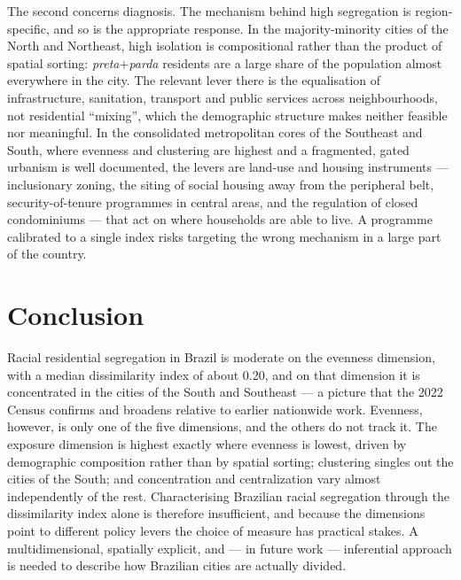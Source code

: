 \documentclass[pdflatex,sn-basic]{sn-jnl}%
\begin{document}
The second concerns diagnosis. The mechanism behind high segregation is region-specific, and so is the appropriate response. In the majority-minority cities of the North and Northeast, high isolation is compositional rather than the product of spatial sorting: \emph{preta}$+$\emph{parda} residents are a large share of the population almost everywhere in the city. The relevant lever there is the equalisation of infrastructure, sanitation, transport and public services across neighbourhoods, not residential ``mixing'', which the demographic structure makes neither feasible nor meaningful. In the consolidated metropolitan cores of the Southeast and South, where evenness and clustering are highest and a fragmented, gated urbanism is well documented, the levers are land-use and housing instruments --- inclusionary zoning, the siting of social housing away from the peripheral belt, security-of-tenure programmes in central areas, and the regulation of closed condominiums --- that act on where households are able to live. A programme calibrated to a single index risks targeting the wrong mechanism in a large part of the country.

\section{Conclusion}\label{sec:conclusion}

Racial residential segregation in Brazil is moderate on the evenness dimension, with a median dissimilarity index of about 0.20, and on that dimension it is concentrated in the cities of the South and Southeast --- a picture that the 2022 Census confirms and broadens relative to earlier nationwide work. Evenness, however, is only one of the five dimensions, and the others do not track it. The exposure dimension is highest exactly where evenness is lowest, driven by demographic composition rather than by spatial sorting; clustering singles out the cities of the South; and concentration and centralization vary almost independently of the rest. Characterising Brazilian racial segregation through the dissimilarity index alone is therefore insufficient, and because the dimensions point to different policy levers the choice of measure has practical stakes. A multidimensional, spatially explicit, and --- in future work --- inferential approach is needed to describe how Brazilian cities are actually divided.

\backmatter


\end{document}
